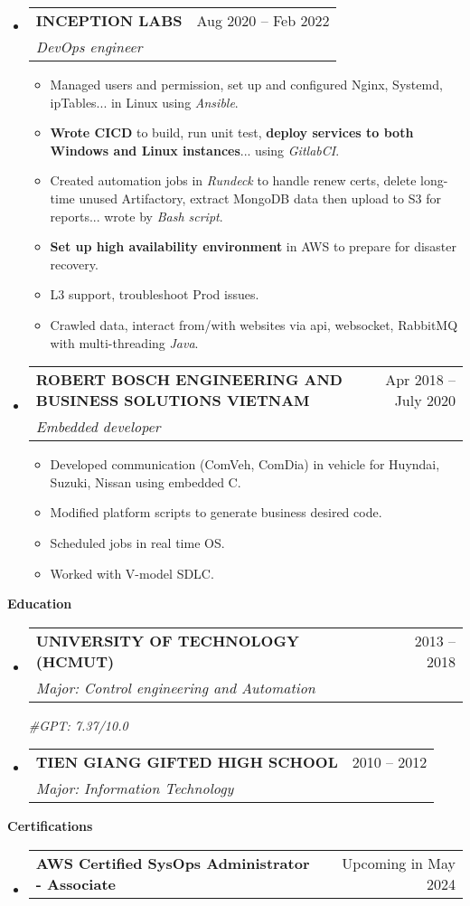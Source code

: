 \documentclass[letterpaper,12pt]{article}[leftmargin=*]
\makeatletter
\def \entryspacing {5pt}
\renewcommand{\section}[2]{\vspace{5pt}
  \colorbox{secondary}{\color{white}\raggedbottom\normalsize\textbf{{#1}{\hspace{7pt}#2}}}
}
\newcommand{\resumeEntryStart}{\begin{itemize}[leftmargin=2.5mm]}
\newcommand{\resumeEntryEnd}{\end{itemize}\vspace{\entryspacing}}
\newcommand{\resumeItemListStart}{\begin{itemize}[leftmargin=4.5mm]}
\newcommand{\resumeItemListEnd}{\end{itemize}}
\newcommand{\resumeItem}[1]{
  \item\small{
    {#1 \vspace{-2pt}}
  }
}
\newcommand{\resumeEntryTSDL}[4]{
  \vspace{-1pt}\item[]
    \begin{tabularx}{0.97\textwidth}{X@{\hspace{60pt}}r}
      \textbf{\color{primary}#1} & {\firabook\color{accent}\small#2} \\
      \textit{\color{accent}\small#3} & {\firabook\color{accent}\small#4} \\
    \end{tabularx}\vspace{-6pt}
}
\newcommand{\resumeEntryTD}[2]{
  \vspace{1pt}\item[]
    \begin{tabularx}{0.97\textwidth}{X@{\hspace{60pt}}r}
      \textbf{\color{primary}#1} & {\firabook\color{accent}\small#2} \\
    \end{tabularx}\vspace{-6pt}
}
\makeatother
\begin{document}
  \resumeEntryStart
    \resumeEntryTSDL
      {INCEPTION LABS}{Aug 2020 -- Feb 2022}
      {DevOps engineer}{}
    \resumeItemListStart
      \resumeItem {Managed users and permission, set up and configured Nginx, Systemd, ipTables... in Linux using \textit{Ansible}.}
      \resumeItem {\textbf{Wrote CICD} to build, run unit test, \textbf{deploy services to both Windows and Linux instances}... using \textit{GitlabCI}.}
      \resumeItem {Created automation jobs in \textit{Rundeck} to handle renew certs, delete long-time unused Artifactory, extract MongoDB data then upload to S3 for reports... wrote by \textit{Bash script}.}
      \resumeItem {\textbf{Set up high availability environment} in AWS to prepare for disaster recovery.}
      \resumeItem {L3 support, troubleshoot Prod issues.}
      \resumeItem {Crawled data, interact from/with websites via api, websocket, RabbitMQ with multi-threading \textit{Java}.}
    \resumeItemListEnd
  \resumeEntryEnd


  \resumeEntryStart
    \resumeEntryTSDL
      {ROBERT BOSCH ENGINEERING AND BUSINESS SOLUTIONS VIETNAM}{Apr 2018 -- July 2020}
      {Embedded developer}{}
    \resumeItemListStart
      \resumeItem {Developed communication (ComVeh, ComDia) in vehicle for Huyndai, Suzuki, Nissan using embedded C.}
      \resumeItem {Modified platform scripts to generate business desired code.}
      \resumeItem {Scheduled jobs in real time OS.}
      \resumeItem {Worked with V-model SDLC.}
    \resumeItemListEnd
  \resumeEntryEnd

\section{\faGraduationCap}{Education}
  \resumeEntryStart
    \resumeEntryTSDL
      {UNIVERSITY OF TECHNOLOGY (HCMUT)}{2013 -- 2018}
      {Major: Control engineering and Automation}{\vspace{5pt}}
      \textit{\color{accent}\small#GPT: 7.37/10.0}
    \resumeEntryTSDL
      {TIEN GIANG GIFTED HIGH SCHOOL}{2010 -- 2012}
      {Major: Information Technology}{}
\resumeEntryEnd


\section{\faAward}{Certifications}
  \resumeEntryStart
    \resumeEntryTD
      {AWS Certified SysOps Administrator - Associate}{Upcoming in May 2024}
  \resumeEntryEnd
  \vspace{-20pt}
  
\end{document}
